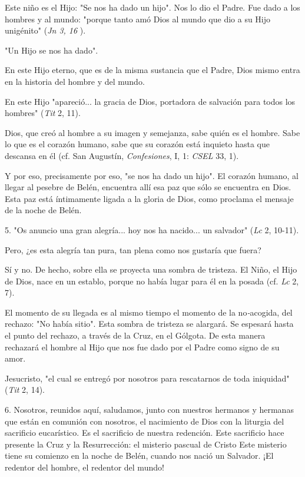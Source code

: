 \begin{body}
\begin{body}
Este niño es el Hijo: "Se nos ha dado un hijo". Nos lo dio el Padre. Fue dado a los hombres y al mundo: "porque tanto amó Dios al mundo que dio a su Hijo unigénito" (\emph{Jn 3, 16} ).

"Un Hijo se nos ha dado".

En este Hijo eterno, que es de la misma sustancia que el Padre, Dios mismo entra en la historia del hombre y del mundo.

En este Hijo "apareció... la gracia de Dios, portadora de salvación para todos los hombres" (\emph{Tit} 2, 11).

Dios, que creó al hombre a su imagen y semejanza, sabe quién es el hombre. Sabe lo que es el corazón humano, sabe que su corazón está inquieto hasta que descansa en él (cf. San Augustín, \emph{Confesiones}, I, 1: \emph{CSEL} 33, 1).

Y por eso, precisamente por eso, "se nos ha dado un hijo". El corazón humano, al llegar al pesebre de Belén, encuentra allí esa paz que sólo se encuentra en Dios. Esta paz está íntimamente ligada a la gloria de Dios, como proclama el mensaje de la noche de Belén.

5. "Os anuncio una gran alegría... hoy nos ha nacido... un salvador" (\emph{Lc} 2, 10-11).

Pero, ¿es esta alegría tan pura, tan plena como nos gustaría que fuera?

Sí y no. De hecho, sobre ella se proyecta una sombra de tristeza. El Niño, el Hijo de Dios, nace en un establo, porque no había lugar para él en la posada (cf. \emph{Lc} 2, 7).

El momento de su llegada es al mismo tiempo el momento de la no\emph{-}acogida, del rechazo: "No había sitio". Esta sombra de tristeza se alargará. Se espesará hasta el punto del rechazo, a través de la Cruz, en el Gólgota. De esta manera rechazará el hombre al Hijo que nos fue dado por el Padre como signo de su amor.

Jesucristo, "el cual se entregó por nosotros para rescatarnos de toda iniquidad" (\emph{Tit} 2, 14).

6. Nosotros, reunidos aquí, saludamos, junto con nuestros hermanos y hermanas que están en comunión con nosotros, el nacimiento de Dios con la liturgia del sacrificio eucarístico. Es el sacrificio de nuestra redención. Este sacrificio hace presente la Cruz y la Resurrección: el misterio pascual de Cristo Este misterio tiene su comienzo en la noche de Belén, cuando nos nació un Salvador. ¡El redentor del hombre, el redentor del mundo!


\end{body}
\end{body}
